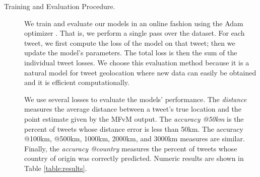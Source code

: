 \documentclass[sigconf,anonymous,review,10pt]{acmart}
\newcommand{\defn}[1]{\textit{#1}}
\begin{document}
\begin{description}
%


\item[Training and Evaluation Procedure.]
We train and evaluate our models in an online fashion using the Adam optimizer \citep{kingma2014adam}.
That is, we perform a single pass over the dataset.
For each tweet, we first compute the loss of the model on that tweet;
then we update the model's parameters.
The total loss is then the sum of the individual tweet losses.
We choose this evaluation method because it is a natural model for tweet geolocation where new data can easily be obtained and it is efficient computationally.

We use several losses to evaluate the models' performance.
The \defn{distance} measures the average distance between a tweet's true location and the point estimate given by the MFvM output.
The \defn{accuracy @50km} is the percent of tweets whose distance error is less than 50km.
The {accuracy @100km, @500km, 1000km, 2000km, and 3000km} measures are similar.
Finally, the \defn{accuracy @country} measures the percent of tweets whose country of origin was correctly predicted.
Numeric results are shown in Table \ref{table:results}.


\end{description}
\end{document}

